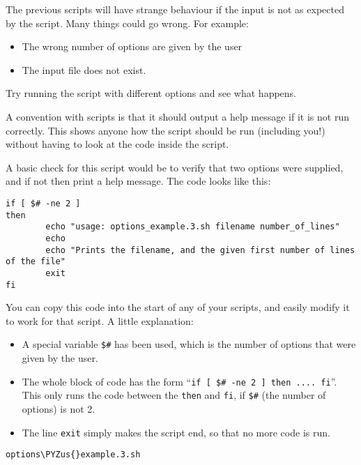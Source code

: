 \documentclass[11pt]{article}
\makeatletter
\providecommand{\tightlist}{%
      \setlength{\itemsep}{0pt}\setlength{\parskip}{0pt}}
\def\PYZus{\char`\_}
\newcommand{\boxspacing}{\kern\kvtcb@left@rule\kern\kvtcb@boxsep}
\newcommand{\prompt}[4]{
        {\ttfamily\llap{{\color{#2}[#3]:\hspace{3pt}#4}}\vspace{-\baselineskip}}
    }
\makeatother
\begin{document}
The previous scripts will have strange behaviour if the input is not as
expected by the script. Many things could go wrong. For example:

\begin{itemize}
\tightlist
\item
  The wrong number of options are given by the user
\item
  The input file does not exist.
\end{itemize}

Try running the script with different options and see what happens.

A convention with scripts is that it should output a help message if it
is not run correctly. This shows anyone how the script should be run
(including you!) without having to look at the code inside the script.

A basic check for this script would be to verify that two options were
supplied, and if not then print a help message. The code looks like
this:

\begin{verbatim}
if [ $# -ne 2 ]
then
        echo "usage: options_example.3.sh filename number_of_lines"
        echo
        echo "Prints the filename, and the given first number of lines of the file"
        exit
fi
\end{verbatim}

You can copy this code into the start of any of your scripts, and easily
modify it to work for that script. A little explanation:

\begin{itemize}
\tightlist
\item
  A special variable \texttt{\$\#} has been used, which is the number of
  options that were given by the user.
\item
  The whole block of code has the form
  ``\texttt{if\ {[}\ \$\#\ -ne\ 2\ {]}\ then\ ....\ fi}''. This only
  runs the code between the \texttt{then} and \texttt{fi}, if
  \texttt{\$\#} (the number of options) is not 2.
\item
  The line \texttt{exit} simply makes the script end, so that no more
  code is run.
\end{itemize}

    \begin{tcolorbox}[breakable, size=fbox, boxrule=1pt, pad at break*=1mm,colback=cellbackground, colframe=cellborder]
\prompt{In}{incolor}{ }{\boxspacing}
\begin{Verbatim}[commandchars=\\\{\}]
options\PYZus{}example.3.sh
\end{Verbatim}
\end{tcolorbox}
\end{document}
